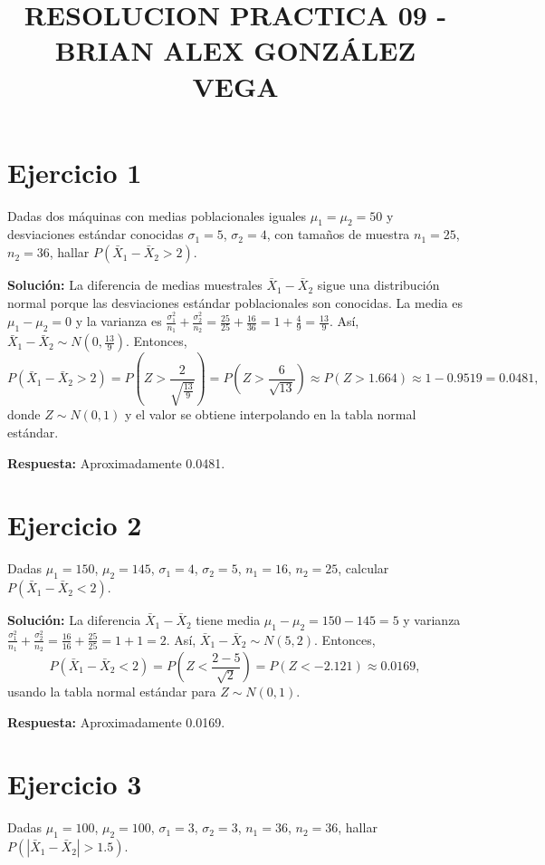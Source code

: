 \documentclass{article}
\begin{document}
\title{RESOLUCION PRACTICA 09 - BRIAN ALEX GONZÁLEZ VEGA}
\author{}
\date{}
\maketitle

\section{Ejercicio 1}
Dadas dos máquinas con medias poblacionales iguales $\mu_1 = \mu_2 = 50$ y desviaciones estándar conocidas $\sigma_1 = 5$, $\sigma_2 = 4$, con tamaños de muestra $n_1 = 25$, $n_2 = 36$, hallar $P(\bar{X}_1 - \bar{X}_2 > 2)$.

\textbf{Solución:}  
La diferencia de medias muestrales $\bar{X}_1 - \bar{X}_2$ sigue una distribución normal porque las desviaciones estándar poblacionales son conocidas. La media es $\mu_1 - \mu_2 = 0$ y la varianza es $\frac{\sigma_1^2}{n_1} + \frac{\sigma_2^2}{n_2} = \frac{25}{25} + \frac{16}{36} = 1 + \frac{4}{9} = \frac{13}{9}$. Así, $\bar{X}_1 - \bar{X}_2 \sim N\left(0, \frac{13}{9}\right)$.  
Entonces,  
\[ P(\bar{X}_1 - \bar{X}_2 > 2) = P\left( Z > \frac{2}{\sqrt{\frac{13}{9}}} \right) = P\left( Z > \frac{6}{\sqrt{13}} \right) \approx P(Z > 1.664) \approx 1 - 0.9519 = 0.0481, \]
donde $Z \sim N(0,1)$ y el valor se obtiene interpolando en la tabla normal estándar.

\textbf{Respuesta:} Aproximadamente 0.0481.

\section{Ejercicio 2}
Dadas $\mu_1 = 150$, $\mu_2 = 145$, $\sigma_1 = 4$, $\sigma_2 = 5$, $n_1 = 16$, $n_2 = 25$, calcular $P(\bar{X}_1 - \bar{X}_2 < 2)$.

\textbf{Solución:}  
La diferencia $\bar{X}_1 - \bar{X}_2$ tiene media $\mu_1 - \mu_2 = 150 - 145 = 5$ y varianza $\frac{\sigma_1^2}{n_1} + \frac{\sigma_2^2}{n_2} = \frac{16}{16} + \frac{25}{25} = 1 + 1 = 2$. Así, $\bar{X}_1 - \bar{X}_2 \sim N(5, 2)$.  
Entonces,  
\[ P(\bar{X}_1 - \bar{X}_2 < 2) = P\left( Z < \frac{2 - 5}{\sqrt{2}} \right) = P(Z < -2.121) \approx 0.0169, \]
usando la tabla normal estándar para $Z \sim N(0,1)$.

\textbf{Respuesta:} Aproximadamente 0.0169.

\section{Ejercicio 3}
Dadas $\mu_1 = 100$, $\mu_2 = 100$, $\sigma_1 = 3$, $\sigma_2 = 3$, $n_1 = 36$, $n_2 = 36$, hallar $P(|\bar{X}_1 - \bar{X}_2| > 1.5)$.
\end{document}
